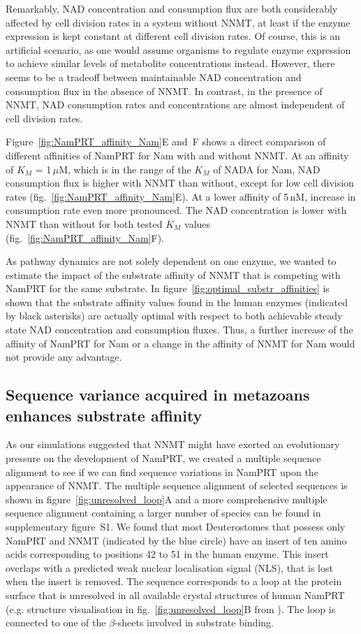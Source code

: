 Remarkably, NAD concentration and consumption flux are both considerably affected by cell division rates in a system without NNMT, at least if the enzyme expression is kept constant at different cell division rates. Of course, this is an artificial scenario, as one would assume organisms to regulate enzyme expression to achieve similar levels of metabolite concentrations instead. However, there seems to be a tradeoff between maintainable NAD concentration and consumption flux in the absence of NNMT. In contrast, in the presence of NNMT, NAD consumption rates and concentrations are almost independent of cell division rates.

Figure~\ref{fig:NamPRT_affinity_Nam}E and~F shows a direct comparison of different affinities of NamPRT for Nam with and without NNMT. At an affinity of $K_{M}$ = 1\,$\mu$M, which is in the range of the $K_{M}$ of NADA for Nam, NAD consumption flux is higher with NNMT than without, except for low cell division rates (fig.~\ref{fig:NamPRT_affinity_Nam}E). At a lower affinity of 5\,nM, increase in consumption rate even more pronounced. The NAD concentration is lower with NNMT than without for both tested $K_{M}$ values (fig.~\ref{fig:NamPRT_affinity_Nam}F).

As pathway dynamics are not solely dependent on one enzyme, we wanted to estimate the impact of the substrate affinity of NNMT that is competing with NamPRT for the same substrate. In figure~\ref{fig:optimal_substr_affinities} is shown that the substrate affinity values found in the human enzymes (indicated by black asterisks) are actually optimal with respect to both achievable steady state NAD concentration and consumption fluxes. Thus, a further increase of the affinity of NamPRT for Nam or a change in the affinity of NNMT for Nam would not provide any advantage.


\subsection{Sequence variance acquired in metazoans enhances substrate affinity}

As our simulations suggested that NNMT might have exerted an evolutionary pressure on the development of NamPRT, we created a multiple sequence alignment to see if we can find sequence variations in NamPRT upon the appearance of NNMT. The multiple sequence alignment of selected sequences is shown in figure~\ref{fig:unresolved_loop}A and a more comprehensive multiple sequence alignment containing a larger number of species can be found in supplementary figure~S1. We found that most Deuterostomes that possess only NamPRT and NNMT (indicated by the blue circle) have an insert of ten amino acids corresponding to positions 42 to 51 in the human enzyme. This insert overlaps with a predicted weak nuclear localisation signal (NLS), that is lost when the insert is removed. The sequence corresponds to a loop at the protein surface that is unresolved in all available crystal structures of human NamPRT (e.g. structure visualisation in fig.~\ref{fig:unresolved_loop}B from \cite{Wang2006}). The loop is connected to one of the $\beta$-sheets involved in substrate binding.

